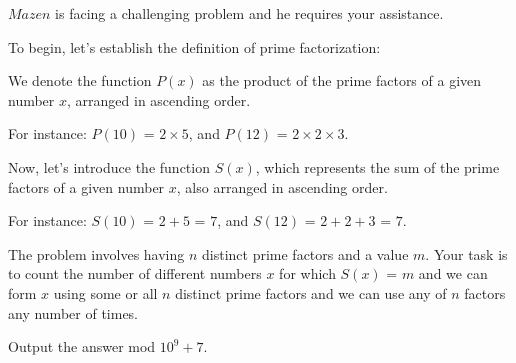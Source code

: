 $Mazen$ is facing a challenging problem and he requires your assistance.

To begin, let's establish the definition of prime factorization:

We denote the function $P(x)$ as the product of the prime factors of a given number $x$, arranged in ascending order.

For instance:
$P(10)$ = $2 \times 5$, and
$P(12)$ = $2 \times 2 \times 3$.

Now, let's introduce the function $S(x)$, which represents the sum of the prime factors of a given number $x$, also arranged in ascending order.

For instance:
$S(10)$ = $2 + 5$ = $7$, and
$S(12)$ = $2 + 2 + 3$ = $7$.

The problem involves having $n$ distinct prime factors and a value $m$. Your task is to count the number of different numbers $x$ for which $S(x)$ = $m$ and we can form $x$ using some or all $n$ distinct prime factors and we can use any of $n$ factors any number of times.

Output the answer mod $10^9 + 7$.